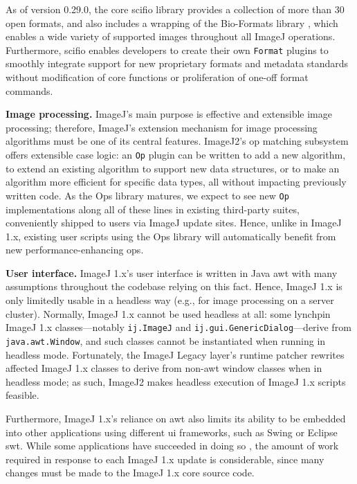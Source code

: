 \documentclass{bmcart}
\begin{document}
As of version 0.29.0, the core \acrshort{scifio} library provides a collection
of more than 30 open formats, and also includes a wrapping of the Bio-Formats
library \cite{bio_formats}, which enables a wide variety of supported images
throughout all ImageJ operations. Furthermore, \acrshort{scifio} enables
developers to create their own \texttt{Format} plugins to smoothly integrate
support for new proprietary formats and metadata standards without modification
of core functions or proliferation of one-off format commands.

\textbf{Image processing.} ImageJ's main purpose is effective and extensible
image processing; therefore, ImageJ's extension mechanism for image processing
algorithms must be one of its central features. ImageJ2's op
matching subsystem offers extensible case logic: an \texttt{Op} plugin can be
written to add a new algorithm, to extend an existing algorithm to support new
data structures, or to make an algorithm more efficient for specific data
types, all without impacting previously written code. As the Ops library
matures, we expect to see new \texttt{Op} implementations along all of these
lines in existing third-party suites, conveniently shipped to users via ImageJ
update sites. Hence, unlike in ImageJ 1.x, existing user scripts using the Ops
library will automatically benefit from new performance-enhancing ops.

\textbf{User interface.} ImageJ 1.x's user interface is written in Java
\acrfull{awt} with many assumptions throughout the codebase relying on this
fact. Hence, ImageJ 1.x is only limitedly usable in a headless way (e.g., for
image processing on a server cluster). Normally, ImageJ 1.x cannot be used
headless at all: some lynchpin ImageJ 1.x classes---notably \texttt{ij.ImageJ}
and \texttt{ij.gui.GenericDialog}---derive from \texttt{java.awt.Window}, and
such classes cannot be instantiated when running in headless mode. Fortunately,
the ImageJ Legacy layer's runtime patcher rewrites affected ImageJ 1.x classes
to derive from non-\acrshort{awt} window classes when in headless mode; as
such, ImageJ2 makes headless execution of ImageJ 1.x scripts feasible.

Furthermore, ImageJ 1.x's reliance on \acrshort{awt} also limits its ability to
be embedded into other applications using different \acrshort{ui} frameworks,
such as Swing or Eclipse \acrfull{swt}. While some applications have succeeded
in doing so \cite{bio7}, the amount of work required in response to each ImageJ
1.x update is considerable, since many changes must be made to the ImageJ 1.x
core source code.
\end{document}
